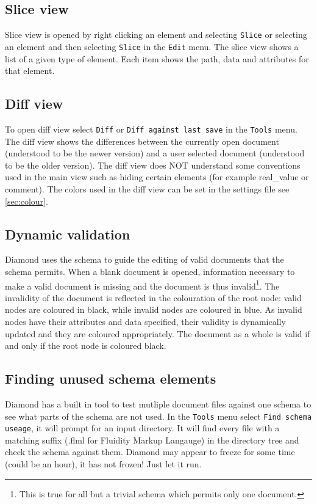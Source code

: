 \subsection{Slice view}
Slice view is opened by right clicking an element and selecting \verb+Slice+ or 
selecting an element and then selecting \verb+Slice+ in the \verb+Edit+ menu. 
The slice view shows a list of a given type of element. Each item shows the path, data and attributes for that element.

\subsection{Diff view}
To open diff view select \verb+Diff+ or \verb+Diff against last save+ in the \verb+Tools+ menu.
The diff view shows the differences between the currently open document (understood to be the newer version)
and a user selected document (understood to be the older version). The diff view does NOT understand some conventions
used in the main view such as hiding certain elements (for example real\_value or comment).
The colors used in the diff view can be set in the settings file see \ref{sec:colour}.

\subsection{Dynamic validation}
Diamond uses the schema to guide the editing of valid documents that the schema 
permits. When a blank document is opened, information necessary to make a valid
document is missing and the document is thus invalid\footnote{This is true for all
but a trivial schema which permits only one document.}. The invalidity of the document
is reflected in the colouration of the root node: valid nodes are coloured in black,
while invalid nodes are coloured in blue. As invalid nodes have their attributes
and data specified, their validity is dynamically updated and they are coloured appropriately.
The document as a whole is valid if and only if the root node is coloured black.

\subsection{Finding unused schema elements}
Diamond has a built in tool to test mutliple document files against one schema to see what parts of the schema are not used.
In the \verb+Tools+ menu select \verb+Find schema useage+, it will prompt for an input directory. It will find every file with
a matching suffix (.flml for Fluidity Markup Langauge) in the directory tree and check the schema against them.
Diamond may appear to freeze for some time (could be an hour), it has not frozen! Just let it run.
